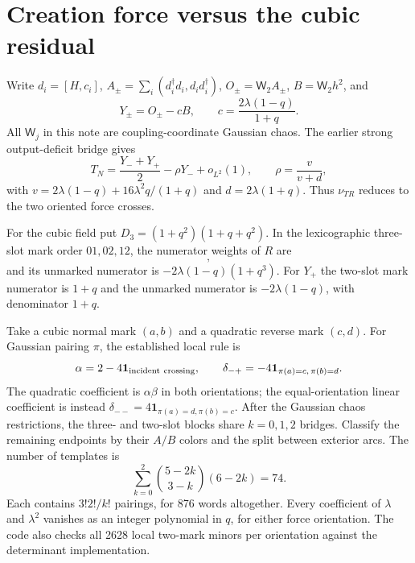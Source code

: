 \documentclass[11pt,a4paper]{article}
\newcommand{\W}[1]{\mathsf W_{#1}}
\begin{document}
\newpage
\section{Creation force versus the cubic residual}
Write $d_i=[H,c_i]$, $A_\pm=\sum_i(d_i^\dagger d_i,d_id_i^\dagger)$,
$O_\pm=\W2 A_\pm$, $B=\W2h^2$, and
\begin{equation}
 Y_\pm=O_\pm-cB,\qquad c=\frac{2\lambda(1-q)}{1+q}.
\end{equation}
All $\W j$ in this note are coupling-coordinate Gaussian chaos.
The earlier strong output-deficit bridge gives
\begin{equation}
 T_N=\frac{Y_-+Y_+}{2}-\rho Y_-+o_{L^2}(1),\qquad
 \rho=\frac{v}{v+d},
\end{equation}
with $v=2\lambda(1-q)+16\lambda^2q/(1+q)$ and $d=2\lambda(1+q)$.
Thus $\nu_{TR}$ reduces to the two oriented force crosses.

For the cubic field put $D_3=(1+q^2)(1+q+q^2)$. In the
lexicographic three-slot mark order $01,02,12$, the numerator
weights of $R$ are
\begin{equation}
 [-q(1+q+q^2),\ D_3,\ -q(1+q+q^2)],
\end{equation}
and its unmarked numerator is $-2\lambda(1-q)(1+q^3)$.
For $Y_+$ the two-slot mark numerator is $1+q$ and the unmarked
numerator is $-2\lambda(1-q)$, with denominator $1+q$.

Take a cubic normal mark $(a,b)$ and a quadratic reverse mark
$(c,d)$. For Gaussian pairing $\pi$, the established local rule is
\begin{equation}
 \alpha=2-4\mathbf1_{\rm incident\ crossing},\qquad
 \delta_{-+}=-4\mathbf1_{\pi(a)=c,\,\pi(b)=d}.
\end{equation}
The quadratic coefficient is $\alpha\beta$ in both orientations;
the equal-orientation linear coefficient is instead
$\delta_{--}=4\mathbf1_{\pi(a)=d,\pi(b)=c}$.
After the Gaussian chaos restrictions, the three- and two-slot
blocks share $k=0,1,2$ bridges. Classify the remaining endpoints
by their $A/B$ colors and the split between exterior arcs. The
number of templates is
\begin{equation}
 \sum_{k=0}^2\binom{5-2k}{3-k}(6-2k)=74.
\end{equation}
Each contains $3!2!/k!$ pairings, for 876 words altogether.
Every coefficient of $\lambda$ and $\lambda^2$ vanishes as an
integer polynomial in $q$, for either force orientation.
The code also checks all 2628 local two-mark minors per orientation
against the determinant implementation.
\end{document}
